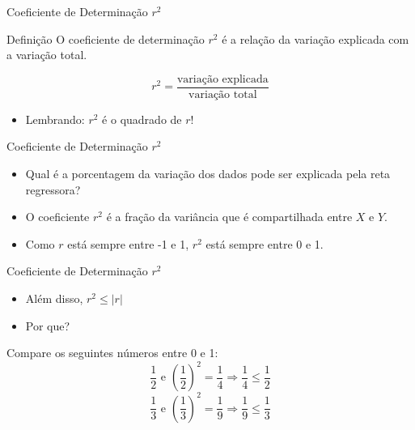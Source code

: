 \documentclass{beamer}
\begin{document}
\begin{frame}{Coeficiente de Determinação $r^2$}
  \begin{block}{Definição}
    O \alert{coeficiente de determinação} $r^2$ é a relação da
    variação explicada com a variação total.
  \end{block}
  \begin{displaymath}
    r^2 = \frac{\text{variação explicada}}{\text{variação total}}
  \end{displaymath}
  \begin{itemize}
  \item Lembrando: $r^2$ é o quadrado de $r$!
  \end{itemize}
\end{frame}

\begin{frame}{Coeficiente de Determinação $r^2$}
  \begin{itemize}
  \item Qual é a porcentagem da variação dos dados pode ser explicada
    pela reta regressora?
  \item O coeficiente $r^2$ é a fração da variância que é
    compartilhada entre $X$ e $Y$.
  \item Como $r$ está sempre entre -1 e 1, $r^2$ está sempre entre 0 e
    1.
  \end{itemize}
\end{frame}

\begin{frame}{Coeficiente de Determinação $r^2$}
  \begin{itemize}
  \item Além disso, $r^2 \le |r|$
  \item Por que?
  \end{itemize}
  \begin{block}{}
    Compare os seguintes números entre 0 e 1:
    \begin{displaymath}
      \frac{1}{2} \text{ e } \left(\frac{1}{2}\right)^2=\frac{1}{4} \Rightarrow
      \frac{1}{4} \le \frac{1}{2}
    \end{displaymath}
    \begin{displaymath}
      \frac{1}{3} \text{ e } \left(\frac{1}{3}\right)^2=\frac{1}{9} \Rightarrow
      \frac{1}{9} \le \frac{1}{3}
    \end{displaymath}
  \end{block}
\end{frame}
\end{document}
